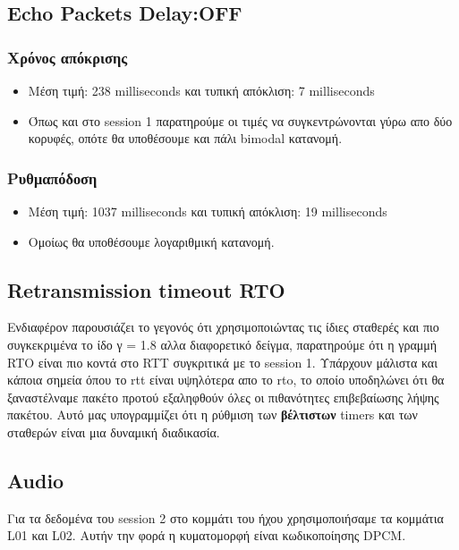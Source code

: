 \documentclass[hidelinks, 12pt, a4paper]{article}
\begin{document}
\subsection{Echo Packets Delay:OFF}
\subsubsection{Χρόνος απόκρισης}

\begin{itemize}
    \item Μέση τιμή: 238 milliseconds και τυπική απόκλιση: 7 milliseconds
    \item Όπως και στο session 1 παρατηρούμε οι τιμές να συγκεντρώνονται γύρω απο δύο κορυφές, οπότε θα υποθέσουμε και πάλι bimodal κατανομή.
\end{itemize}

\subsubsection{Ρυθμαπόδοση}

\begin{itemize}
    \item Μέση τιμή: 1037 milliseconds και τυπική απόκλιση: 19 milliseconds
    \item Ομοίως θα υποθέσουμε λογαριθμική κατανομή.
\end{itemize}

\subsection{Retransmission timeout RTO}

Ενδιαφέρον παρουσιάζει το γεγονός ότι χρησιμοποιώντας τις ίδιες σταθερές και πιο συγκεκριμένα το ίδο γ = 1.8 αλλα διαφορετικό δείγμα, παρατηρούμε ότι η γραμμή RTO είναι πιο κοντά στο RTT συγκριτικά με το session 1. Υπάρχουν μάλιστα και κάποια σημεία όπου το rtt είναι υψηλότερα απο το rto, το οποίο υποδηλώνει ότι θα ξαναστέλναμε πακέτο προτού εξαληφθούν όλες οι πιθανότητες επιβεβαίωσης λήψης πακέτου. Αυτό μας υπογραμμίζει ότι η ρύθμιση των \textbf{βέλτιστων} timers και των σταθερών είναι μια δυναμική διαδικασία.

\subsection{Audio}

Για τα δεδομένα του session 2 στο κομμάτι του ήχου χρησιμοποιήσαμε τα κομμάτια L01 και L02. Αυτήν την φορά η κυματομορφή είναι κωδικοποίησης DPCM.
\end{document}
